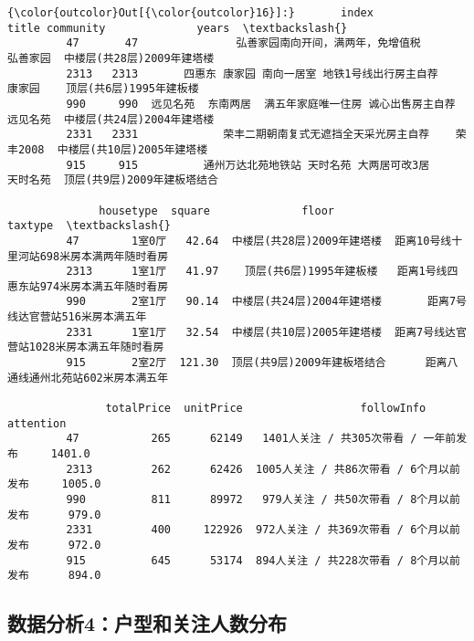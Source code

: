 \documentclass[11pt]{article}
\begin{document}
\begin{Verbatim}[commandchars=\\\{\}]
{\color{outcolor}Out[{\color{outcolor}16}]:}       index                           title community              years  \textbackslash{}
         47       47               弘善家园南向开间，满两年，免增值税      弘善家园  中楼层(共28层)2009年建塔楼   
         2313   2313       四惠东 康家园 南向一居室 地铁1号线出行房主自荐       康家园    顶层(共6层)1995年建板楼   
         990     990  远见名苑  东南两居  满五年家庭唯一住房 诚心出售房主自荐      远见名苑  中楼层(共24层)2004年建塔楼   
         2331   2331             荣丰二期朝南复式无遮挡全天采光房主自荐    荣丰2008  中楼层(共10层)2005年建塔楼   
         915     915          通州万达北苑地铁站 天时名苑 大两居可改3居      天时名苑  顶层(共9层)2009年建板塔结合   
         
              housetype  square              floor                  taxtype  \textbackslash{}
         47        1室0厅   42.64  中楼层(共28层)2009年建塔楼  距离10号线十里河站698米房本满两年随时看房   
         2313      1室1厅   41.97    顶层(共6层)1995年建板楼   距离1号线四惠东站974米房本满五年随时看房   
         990       2室1厅   90.14  中楼层(共24层)2004年建塔楼       距离7号线达官营站516米房本满五年   
         2331      1室1厅   32.54  中楼层(共10层)2005年建塔楼  距离7号线达官营站1028米房本满五年随时看房   
         915       2室2厅  121.30  顶层(共9层)2009年建板塔结合      距离八通线通州北苑站602米房本满五年   
         
               totalPrice  unitPrice                  followInfo  attention  
         47           265      62149   1401人关注 / 共305次带看 / 一年前发布     1401.0  
         2313         262      62426  1005人关注 / 共86次带看 / 6个月以前发布     1005.0  
         990          811      89972   979人关注 / 共50次带看 / 8个月以前发布      979.0  
         2331         400     122926  972人关注 / 共369次带看 / 6个月以前发布      972.0  
         915          645      53174  894人关注 / 共228次带看 / 8个月以前发布      894.0  
\end{Verbatim}
            
    \subsection{数据分析4：户型和关注人数分布}\label{ux6570ux636eux5206ux67904ux6237ux578bux548cux5173ux6ce8ux4ebaux6570ux5206ux5e03}
\end{document}
